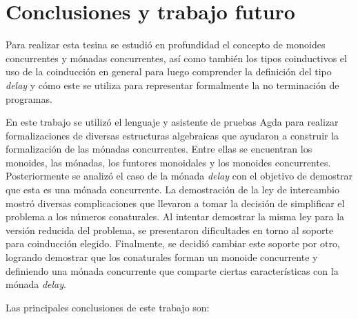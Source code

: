 \chapter{Conclusiones y trabajo futuro}

Para realizar esta tesina se estudió en profundidad el concepto de monoides concurrentes y mónadas concurrentes, así como también los tipos coinductivos el uso de la coinducción en general para luego comprender la definición del tipo \textit{delay} y cómo este se utiliza para representar formalmente la no terminación de programas. 

En este trabajo se utilizó el lenguaje y asistente de pruebas Agda para realizar formalizaciones de diversas estructuras algebraicas que ayudaron a construir la formalización de las mónadas concurrentes. Entre ellas se encuentran los monoides, las mónadas, los funtores monoidales y los monoides concurrentes. Posteriormente se analizó el caso de la mónada \textit{delay} con el objetivo de demostrar que esta es una mónada concurrente. La demostración de la ley de intercambio mostró diversas complicaciones que llevaron a tomar la decisión de simplificar el problema a los números conaturales. Al intentar demostrar la misma ley para la versión reducida del problema, se presentaron dificultades en torno al soporte para coinducción elegido. Finalmente, se decidió cambiar este soporte por otro, logrando demostrar que los conaturales forman un monoide concurrente y definiendo una mónada concurrente que comparte ciertas características con la mónada \textit{delay}. 

Las principales conclusiones de este trabajo son: 

